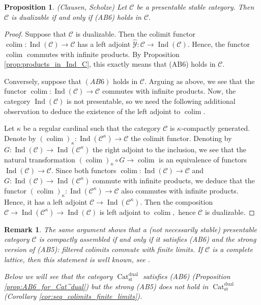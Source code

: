 \documentclass[11pt,leqno]{amsart}
\newtheorem{prop}[theo]{Proposition}
\newtheorem{remark}[theo]{Remark}
\numberwithin{equation}{section}
\DeclareMathOperator*{\colim}{colim}
\newcommand{\Cat}{\operatorname{Cat}}
\newcommand{\st}{\operatorname{st}}
\newcommand{\dual}{\operatorname{dual}}
\newcommand{\cC}{{\mathcal C}}
\newcommand{\cY}{{\mathcal Y}}
\newcommand{\Ind}{\operatorname{Ind}}
\begin{document}
\begin{prop}\label{prop:AB6_criterion} (Clausen, Scholze) Let $\cC$ be a presentable stable category. Then $\cC$ is dualizable if and only if (AB6) holds in $\cC.$\end{prop}

\begin{proof}Suppose that $\cC$ is dualizable. Then the colimit functor $\colim:\Ind(\cC)\to\cC$ has a left adjoint $\hat{\cY}:\cC\to \Ind(\cC).$ Hence, the functor $\colim$ commutes with infinite products. By Proposition \ref{prop:products_in_Ind_C}, this exactly means that (AB6) holds in $\cC.$ 

Conversely, suppose that $(AB6)$ holds in $\cC.$ Arguing as above, we see that the functor $\colim:\Ind(\cC)\to\cC$ commutes with infinite products. Now, the category $\Ind(\cC)$ is not presentable, so we need the following additional observation to deduce the existence of the left adjoint to $\colim.$

Let $\kappa$ be a regular cardinal such that the category $\cC$ is $\kappa$-compactly generated. Denote by $(\colim)_{\kappa}:\Ind(\cC^{\kappa})\to\cC$ the colimit functor. Denoting by $G:\Ind(\cC)\to \Ind(\cC^{\kappa})$ the right adjoint to the inclusion, we see that the natural transformation $(\colim)_{\kappa}\circ G\to \colim$ is an equivalence of functors $\Ind(\cC)\to \cC.$ Since both functors $\colim:\Ind(\cC)\to\cC$ and $G:\Ind(\cC)\to \Ind(\cC^{\kappa})$ commute with infinite products, we deduce that the functor $(\colim)_{\kappa}:\Ind(\cC^{\kappa})\to\cC$ also commutes with infinite products. Hence, it has a left adjoint $\cC\to \Ind(\cC^{\kappa}).$ Then the composition $\cC\to \Ind(\cC^{\kappa})\to \Ind(\cC)$ is left adjoint to $\colim,$ hence $\cC$ is dualizable.\end{proof}

\begin{remark} The same argument shows that a (not necessarily stable) presentable category $\cC$ is compactly assembled if and only if it satisfies (AB6) and the strong version of (AB5): filtered colimits commute with finite limits. If $\cC$ is a complete lattice, then this statement is well known, see \cite[Theorem I.2.3]{GHKLMS}. 

Below we will see that the category $\Cat_{\st}^{\dual}$ satisfies (AB6) (Proposition \ref{prop:AB6_for_Cat^dual}) but the strong (AB5) does not hold in $\Cat_{\st}^{\dual}$ (Corollary \ref{cor:seq_colimits_finite_limits}). \end{remark}
\end{document}
